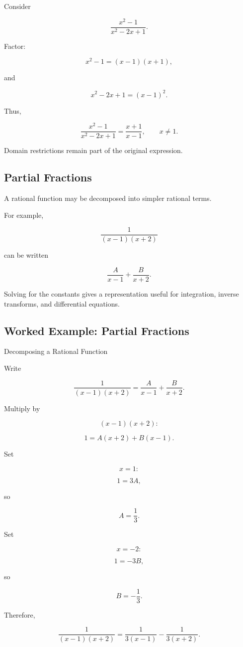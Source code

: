 Consider

\[
\frac{
x^2-1
}{
x^2-2x+1
}.
\]

Factor:

\[
x^2-1
=
(x-1)(x+1),
\]

and

\[
x^2-2x+1
=
(x-1)^2.
\]

Thus,

\[
\boxed{
\frac{
x^2-1
}{
x^2-2x+1
}
=
\frac{
x+1
}{
x-1
},
\qquad
x\neq1.
}
\]

Domain restrictions remain part of the original expression.

\subsection{Partial Fractions}
\label{subsec:symbolic-partial-fractions}

A rational function may be decomposed into simpler rational terms.

For example,

\[
\frac{
1
}{
(x-1)(x+2)
}
\]

can be written

\[
\boxed{
\frac{A}{x-1}
+
\frac{B}{x+2}.
}
\]

Solving for the constants gives a representation useful for integration,
inverse transforms, and differential equations.

\subsection{Worked Example: Partial Fractions}
\label{subsec:worked-partial-fractions}

\begin{workedexamplebox}{Decomposing a Rational Function}

Write

\[
\frac1{(x-1)(x+2)}
=
\frac{A}{x-1}
+
\frac{B}{x+2}.
\]

Multiply by

\[
(x-1)(x+2):
\]

\[
1
=
A(x+2)
+
B(x-1).
\]

Set

\[
x=1:
\]

\[
1=3A,
\]

so

\[
A=\frac13.
\]

Set

\[
x=-2:
\]

\[
1=-3B,
\]

so

\[
B=-\frac13.
\]

Therefore,

\begin{answerbox}
\[
\boxed{
\frac1{(x-1)(x+2)}
=
\frac1{3(x-1)}
-
\frac1{3(x+2)}.
}
\]
\end{answerbox}

\end{workedexamplebox}

